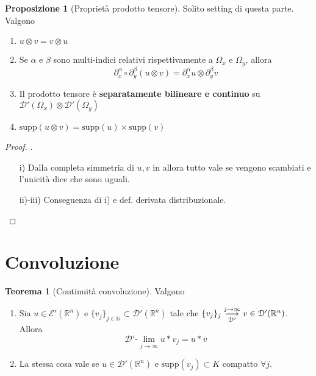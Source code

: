 \documentclass[a4paper,10pt]{article}
\theoremstyle{definition}
\newcommand{\na}{\mathbb{N}} %
\newcommand{\re}{\mathbb{R}} %
\newcommand{\supp}{\text{supp}} %
\newcommand{\llim}[2]{#2\text{-}\lim_{#1\to\infty}} %
\newcommand{\limm}[2]{\overunderset{#1\to\infty}{#2}{\longrightarrow}} %
\theoremstyle{indentdefinition}
\theoremstyle{indenttheorem}
\newtheorem{thm}{Teorema}
\newtheorem{prop}{Proposizione}
\theoremstyle{myremark}
\theoremstyle{indentgeneral}
\newenvironment{myboxed} 
{\noindent\begin{lrbox}{\mybox}\begin{minipage}{\textwidth}}
{\end{minipage}\end{lrbox}\fbox{\usebox{\mybox}}}
\begin{document}
\begin{myboxed}
    \begin{prop}[Proprietà prodotto tensore]
        Solito setting di questa parte. Valgono 
        \begin{enumerate}
            \item $u\otimes v=v\otimes u$
            \item Se $\alpha$ e $\beta$ sono multi-indici relativi  rispettivamente a $\Omega_x$ e $\Omega_y$, allora
            $$\partial^\alpha_x\circ\partial^\beta_y(u\otimes v)=\partial^\alpha_xu\otimes\partial^\beta_yv$$
            \item Il prodotto tensore è \textbf{separatamente bilineare e continuo} su $\mathcal{D'}(\Omega_x)\otimes\mathcal{D'}(\Omega_y)$
            \item $\supp(u\otimes v)=\supp(u)\times \supp(v)$
        \end{enumerate}
    \end{prop}
\end{myboxed}
\begin{proof}
    .
    \begin{itemize}
        \item[i)] Dalla completa simmetria di $u,v$ in  allora tutto vale se vengono scambiati e l'unicità dice che sono uguali.
        \item[ii)-iii)] Conseguenza di i) e def. derivata distribuzionale.
    \end{itemize}
\end{proof}

\section{Convoluzione}
\begin{myboxed}
    \begin{thm}[Continuità convoluzione]\label{thm-continuità-convoluzione}
        Valgono
        \begin{enumerate}
            \item Sia $u\in\mathcal{E}'(\re^n)$ e $\{v_j\}_{j\in\na}\subset  \mathcal{D}'(\re^n)$ tale che $\{v_j\}_{j}\limm{j}{\mathcal{D}'} v\in \mathcal{D}'(\re^n)$. Allora
            $$\llim{j}{\mathcal{D}'}u*v_j=u*v$$
            \item La stessa cosa vale se $u\in\mathcal{D}'(\re^n)$ e $\supp(v_j)\subset K$ compatto $\forall j$.
        \end{enumerate}
    \end{thm}
\end{myboxed}
\end{document}
